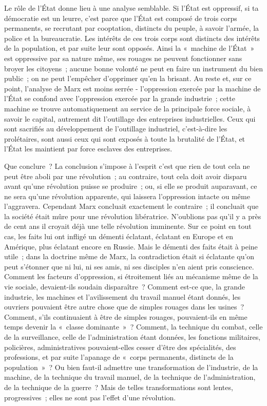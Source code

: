 \documentclass[french,twoside]{book} %
\begin{document}
Le rôle de l'État donne lieu à une analyse semblable. Si l'État est oppressif, si ta démocratie est un leurre, c'est parce que l'État est composé de trois corps permanents, se recrutant par cooptation, distincts du peuple, à savoir l'armée, la police et la bureaucratie. Les intérêts de ces trois corps sont distincts des intérêts de la population, et par suite leur sont opposés. Ainsi la « machine de l'État » est oppressive par sa nature même, ses rouages ne peuvent fonctionner sans broyer les citoyens ; aucune bonne volonté ne peut en faire un instrument du bien public ; on ne peut l'empêcher d'opprimer qu'en la brisant. Au reste et, sur ce point, l'analyse de Marx est moins serrée - l'oppression exercée par la machine de l'État se confond avec l'oppression exercée par la grande industrie ; cette machine se trouve automatiquement au service de la principale force sociale, à savoir le capital, autrement dit l'outillage des entreprises industrielles. Ceux qui sont sacrifiés au développement de l'outillage industriel, c'est-à-dire les prolétaires, sont aussi ceux qui sont exposés à toute la brutalité de l'État, et l'État les maintient par force esclaves des entreprises.\par
Que conclure ? La conclusion s'impose à l'esprit c'est que rien de tout cela ne peut être aboli par une révolution ; au contraire, tout cela doit avoir disparu avant qu'une révolution puisse se produire ; ou, si elle se produit auparavant, ce ne sera qu'une révolution apparente, qui laissera l'oppression intacte ou même l'aggravera. Cependant Marx concluait exactement le contraire ; il concluait que la société était mûre pour une révolution libératrice. N'oublions pas qu'il y a près de cent ans il croyait déjà une telle révolution imminente. Sur ce point en tout cas, les faits lui ont infligé un démenti éclatant, éclatant en Europe et en Amérique, plus éclatant encore en Russie. Mais le démenti des faits était à peine utile ; dans la doctrine même de Marx, la contradiction était si éclatante qu'on peut s'étonner que ni lui, ni ses amis, ni ses disciples n'en aient pris conscience. Comment les facteurs d'oppression, si étroitement liés au mécanisme même de la vie sociale, devaient-ils soudain disparaître ? Comment est-ce que, la grande industrie, les machines et l'avilissement du travail manuel étant donnés, les ouvriers pouvaient être autre chose que de simples rouages dans les usines ? Comment, s'ils continuaient à être de simples rouages, pouvaient-ils en même temps devenir la « classe dominante » ? Comment, la technique du combat, celle de la surveillance, celle de l'administration étant données, les fonctions militaires, policières, administratives pouvaient-elles cesser d'être des spécialités, des professions, et par suite l'apanage de « corps permanents, distincts de la population » ? Ou bien faut-il admettre une transformation de l'industrie, de la machine, de la technique du travail manuel, de la technique de l'administration, de la technique de la guerre ? Mais de telles transformations sont lentes, progressives ; elles ne sont pas l'effet d'une révolution.\par
\end{document}
